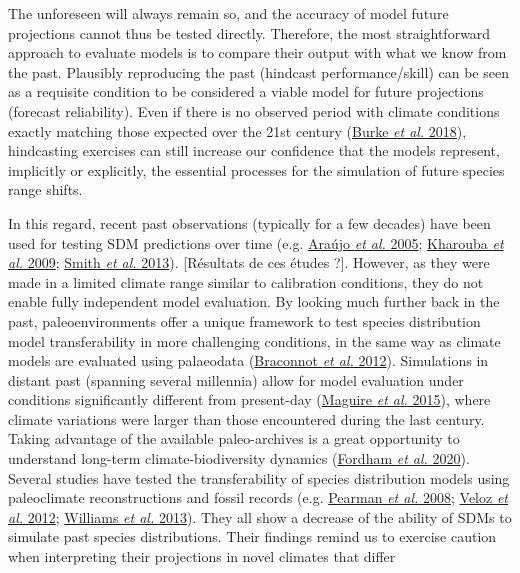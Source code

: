 \documentclass[11pt,]{article}
\begin{document}
The unforeseen will always remain so, and the accuracy of model future
projections cannot thus be tested directly. Therefore, the most
straightforward approach to evaluate models is to compare their output
with what we know from the past. Plausibly reproducing the past
(hindcast performance/skill) can be seen as a requisite condition to be
considered a viable model for future projections (forecast reliability).
Even if there is no observed period with climate conditions exactly
matching those expected over the 21st century
(\protect\hyperlink{ref-Burke2018}{Burke \emph{et al.} 2018}),
hindcasting exercises can still increase our confidence that the models
represent, implicitly or explicitly, the essential processes for the
simulation of future species range shifts.

In this regard, recent past observations (typically for a few decades)
have been used for testing SDM predictions over time (e.g.
\protect\hyperlink{ref-Araujo2005}{Araújo \emph{et al.} 2005};
\protect\hyperlink{ref-Kharouba2009}{Kharouba \emph{et al.} 2009};
\protect\hyperlink{ref-Smith2013}{Smith \emph{et al.} 2013}).
{[}Résultats de ces études ?{]}. However, as they were made in a limited
climate range similar to calibration conditions, they do not enable
fully independent model evaluation. By looking much further back in the
past, paleoenvironments offer a unique framework to test species
distribution model transferability in more challenging conditions, in
the same way as climate models are evaluated using palaeodata
(\protect\hyperlink{ref-Braconnot2012}{Braconnot \emph{et al.} 2012}).
Simulations in distant past (spanning several millennia) allow for model
evaluation under conditions significantly different from present-day
(\protect\hyperlink{ref-Maguire2015}{Maguire \emph{et al.} 2015}), where
climate variations were larger than those encountered during the last
century. Taking advantage of the available paleo-archives is a great
opportunity to understand long-term climate-biodiversity dynamics
(\protect\hyperlink{ref-Fordham2020}{Fordham \emph{et al.} 2020}).
Several studies have tested the transferability of species distribution
models using paleoclimate reconstructions and fossil records (e.g.
\protect\hyperlink{ref-Pearman2008}{Pearman \emph{et al.} 2008};
\protect\hyperlink{ref-Veloz2012}{Veloz \emph{et al.} 2012};
\protect\hyperlink{ref-Williams2013}{Williams \emph{et al.} 2013}). They
all show a decrease of the ability of SDMs to simulate past species
distributions. Their findings remind us to exercise caution when
interpreting their projections in novel climates that differ
\end{document}
